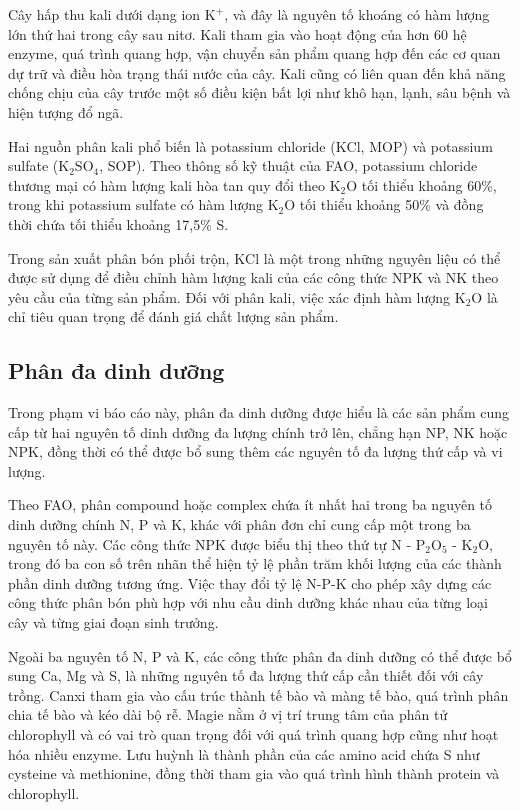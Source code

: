 Cây hấp thu kali dưới dạng ion \(\mathrm{K^+}\), và đây là nguyên tố khoáng có hàm lượng lớn thứ hai trong cây sau nitơ.
Kali tham gia vào hoạt động của hơn 60 hệ enzyme, quá trình quang hợp, vận chuyển sản phẩm quang hợp đến các cơ quan dự trữ và điều hòa trạng thái nước của cây. 
Kali cũng có liên quan đến khả năng chống chịu của cây trước một số điều kiện bất lợi như khô hạn, lạnh, sâu bệnh và hiện tượng đổ ngã.

Hai nguồn phân kali phổ biến là potassium chloride (\(\mathrm{KCl}\), MOP) và potassium sulfate (\(\mathrm{K_2SO_4}\), SOP).
Theo thông số kỹ thuật của FAO, potassium chloride thương mại có hàm lượng kali hòa tan quy đổi theo \(\mathrm{K_2O}\) tối thiểu khoảng 60\%, trong khi potassium sulfate có hàm lượng \(\mathrm{K_2O}\) tối thiểu khoảng 50\% và đồng thời chứa tối thiểu khoảng 17,5\% S.\cite{fao-fertilizer-specifications}

Trong sản xuất phân bón phối trộn, \(\mathrm{KCl}\) là một trong những nguyên liệu có thể được sử dụng để điều chỉnh hàm lượng kali của các công thức NPK và NK theo yêu cầu của từng sản phẩm.
Đối với phân kali, việc xác định hàm lượng \(\mathrm{K_2O}\) là chỉ tiêu quan trọng để đánh giá chất lượng sản phẩm. \cite{fao-fertilizer-specifications}

\subsection{Phân đa dinh dưỡng}
Trong phạm vi báo cáo này, phân đa dinh dưỡng được hiểu là các sản phẩm cung cấp từ hai nguyên tố dinh dưỡng đa lượng chính trở lên, chẳng hạn NP, NK hoặc NPK, đồng thời có thể được bổ sung thêm các nguyên tố đa lượng thứ cấp và vi lượng.

Theo FAO, phân compound hoặc complex chứa ít nhất hai trong ba nguyên tố dinh dưỡng chính N, P và K, khác với phân đơn chỉ cung cấp một trong ba nguyên tố này. \cite{fao-fertilizer-specifications}
Các công thức NPK được biểu thị theo thứ tự N - \(\mathrm{P_2O_5}\) - \(\mathrm{K_2O}\), trong đó ba con số trên nhãn thể hiện tỷ lệ phần trăm khối lượng của các thành phần dinh dưỡng tương ứng. \cite{fao-fertilizer-specifications}
Việc thay đổi tỷ lệ N-P-K cho phép xây dựng các công thức phân bón phù hợp với nhu cầu dinh dưỡng khác nhau của từng loại cây và từng giai đoạn sinh trưởng. 

Ngoài ba nguyên tố N, P và K, các công thức phân đa dinh dưỡng có thể được bổ sung Ca, Mg và S, là những nguyên tố đa lượng thứ cấp cần thiết đối với cây trồng. \cite{fao-integrated-nutrition}
Canxi tham gia vào cấu trúc thành tế bào và màng tế bào, quá trình phân chia tế bào và kéo dài bộ rễ. 
Magie nằm ở vị trí trung tâm của phân tử chlorophyll và có vai trò quan trọng đối với quá trình quang hợp cũng như hoạt hóa nhiều enzyme. 
Lưu huỳnh là thành phần của các amino acid chứa S như cysteine và methionine, đồng thời tham gia vào quá trình hình thành protein và chlorophyll.

